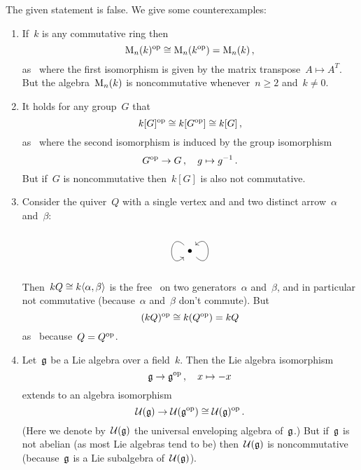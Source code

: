 \section{}


\subsection{}

The given statement is false.
We give some counterexamples:
\begin{enumerate}
  \item
    If~$k$ is any commutative ring then
    \[
            \operatorname{M}_{n}(k)^{\mathrm{op}}
      \cong \operatorname{M}_{n}(k^{\mathrm{op}})
      =     \operatorname{M}_{n}(k) \,,
    \]
    as~{\kalgs} where the first isomorphism is given by the matrix transpose~$A \mapsto A^T$.
    But the algebra~$\operatorname{M}_{n}(k)$ is noncommutative whenever~$n \geq 2$ and~$k \neq 0$.
  \item
    It holds for any group~$G$ that
    \[
            k[G]^{\mathrm{op}}
      \cong k[G^{\mathrm{op}}]
      \cong k[G] \,,
    \]
    as~{\kalgs} where the second isomorphism is induced by the group isomorphism
    \[
              G^{\mathrm{op}}
      \to     G \,,
      \quad   g
      \mapsto g^{-1} \,.
    \]
    But if~$G$ is noncommutative then~$k[G]$ is also not commutative.
  \item
    Consider the quiver~$Q$ with a single vertex and and two distinct arrow~$\alpha$ and~$\beta$:
    \[
      \begin{tikzcd}
        \bullet
        \arrow[loop,out=315,in=405,looseness=5]
        \arrow[loop,out=135,in=225,looseness=5]
      \end{tikzcd}
    \]
    Then~$kQ \cong k\langle\alpha,\beta\rangle$ is the free~{\kalg} on two generators~$\alpha$ and~$\beta$, and in particular not commutative (because~$\alpha$ and~$\beta$ don’t commute).
    But
    \[
            (kQ)^{\mathrm{op}}
      \cong k(Q^{\mathrm{op}})
      =     kQ
    \]
    as~{\kalgs} because~$Q = Q^{\mathrm{op}}$.
  \item
    Let~$\mathfrak{g}$ be a Lie algebra over a field~$k$.
    Then the Lie algebra isomorphism
    \[
              \mathfrak{g}
      \to     \mathfrak{g}^{\mathrm{op}} \,,
      \quad   x
      \mapsto -x
    \]
    extends to an algebra isomorphism
    \[
            \mathcal{U}(\mathfrak{g})
      \to   \mathcal{U}(\mathfrak{g}^{\mathrm{op}})
      \cong \mathcal{U}(\mathfrak{g})^{\mathrm{op}} \,.
    \]
    (Here we denote by~$\mathcal{U}(\mathfrak{g})$ the universal enveloping algebra of~$\mathfrak{g}$.)
    But if~$\mathfrak{g}$ is not abelian (as most Lie algebras tend to be) then~$\mathcal{U}(\mathfrak{g})$ is noncommutative (because~$\mathfrak{g}$ is a Lie subalgebra of~$\mathcal{U}(\mathfrak{g})$).
\end{enumerate}





